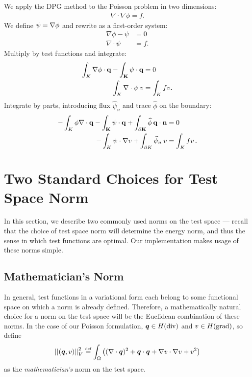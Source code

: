 We apply the DPG method to the Poisson problem in two dimensions:
\begin{align*}
\nabla \cdot \nabla \phi = f.
\end{align*}
We define $\bf{\psi} = \nabla \phi$ and rewrite as a first-order system:
\begin{align*}
\nabla \phi - \psi &= 0\\
\nabla \cdot \psi &= f.
\end{align*}
Multiply by test functions and integrate:
\begin{align*}
\int_K \nabla \phi \cdot \bf{q} - \int_K \psi \cdot \bf{q} &= 0\\
\int_K \nabla \cdot \psi \: v &= \int_K f v.
\end{align*}
Integrate by parts, introducing flux $\widehat{\psi}_n$ and trace $\widehat{\phi}$ on the boundary:
\begin{align*}
- \int_K \phi \nabla \cdot \bf{q} - \int_K \psi \cdot \bf{q} + \int_{\partial K} \widehat{\phi} \: \bf{q} \cdot \bf{n} &= 0\\
- \int_K \psi \cdot \nabla v + \int_{\partial K} \widehat{\psi}_n \: v &= \int_K f v \,.
\end{align*}

\section{Two Standard Choices for Test Space Norm}\label{NVR:sec:testNorms}
In this section, we describe two commonly used norms on the test space --- recall that the choice of test space norm will determine the energy norm, and thus the sense in which test functions are optimal.  Our implementation makes usage of these norms simple.
\subsection{Mathematician's Norm}
In general, test functions in a variational form each belong to some functional space on which a norm is already defined.  Therefore, a mathematically natural choice for a norm on the test space will be the Euclidean combination of these norms.  In the case of our Poisson formulation, $\NVRvect{q} \in \NVRHdiv$ and $v \in \NVRHgrad$, so define
\begin{align*}
\NVRnorm{(\NVRvect{q},v)}_{V}^{2}  \NVReqdef \int_{\Omega} &\left((\NVRdiv \NVRvect{q})^{2} + \NVRvect{q} \cdot \NVRvect{q} + \NVRgrad v \cdot \NVRgrad v + v^{2}\right)\\
\end{align*}
as the \emph{mathematician's} norm on the test space.

